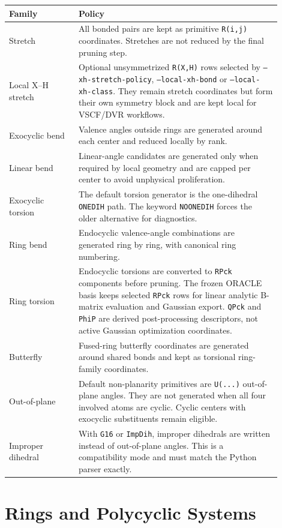 \documentclass[11pt]{article}
\begin{document}
\begin{longtable}{@{}p{0.23\linewidth}p{0.67\linewidth}@{}}
\toprule
Family & Policy \\
\midrule
\endhead
Stretch & All bonded pairs are kept as primitive \texttt{R(i,j)} coordinates.
Stretches are not reduced by the final pruning step. \\
Local X--H stretch & Optional unsymmetrized \texttt{R(X,H)} rows selected by
\texttt{--xh-stretch-policy}, \texttt{--local-xh-bond} or
\texttt{--local-xh-class}.  They remain stretch coordinates but form their own
symmetry block and are kept local for VSCF/DVR workflows. \\
Exocyclic bend & Valence angles outside rings are generated around each center
and reduced locally by rank. \\
Linear bend & Linear-angle candidates are generated only when required by local
geometry and are capped per center to avoid unphysical proliferation. \\
Exocyclic torsion & The default torsion generator is the one-dihedral
\texttt{ONEDIH} path.  The keyword \texttt{NOONEDIH} forces the older
alternative for diagnostics. \\
Ring bend & Endocyclic valence-angle combinations are generated ring by ring,
with canonical ring numbering. \\
Ring torsion & Endocyclic torsions are converted to \texttt{RPck} components
before pruning.  The frozen ORACLE basis keeps selected \texttt{RPck} rows for
linear analytic B-matrix evaluation and Gaussian export.  \texttt{QPck} and
\texttt{PhiP} are derived post-processing descriptors, not active Gaussian
optimization coordinates. \\
Butterfly & Fused-ring butterfly coordinates are generated around shared bonds
and kept as torsional ring-family coordinates. \\
Out-of-plane & Default non-planarity primitives are \texttt{U(...)} out-of-plane
angles.  They are not generated when all four involved atoms are cyclic.  Cyclic
centers with exocyclic substituents remain eligible. \\
Improper dihedral & With \texttt{G16} or \texttt{ImpDih}, improper dihedrals are
written instead of out-of-plane angles.  This is a compatibility mode and must
match the Python parser exactly. \\
\bottomrule
\end{longtable}

\section{Rings and Polycyclic Systems}
\end{document}
